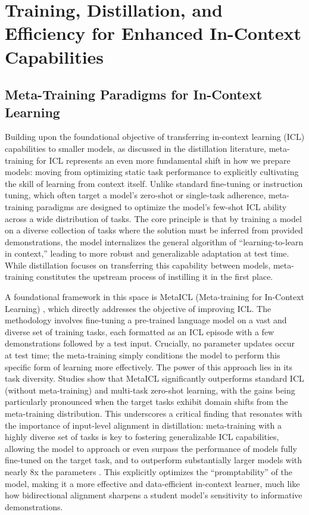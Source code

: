 \documentclass[11pt]{article}
\begin{document}
\section{Training, Distillation, and Efficiency for Enhanced In-Context Capabilities}

\subsection{Meta-Training Paradigms for In-Context Learning}

Building upon the foundational objective of transferring in-context learning (ICL) capabilities to smaller models, as discussed in the distillation literature, meta-training for ICL represents an even more fundamental shift in how we prepare models: moving from optimizing static task performance to explicitly cultivating the skill of learning from context itself. Unlike standard fine-tuning or instruction tuning, which often target a model's zero-shot or single-task adherence, meta-training paradigms are designed to optimize the model's few-shot ICL ability across a wide distribution of tasks. The core principle is that by training a model on a diverse collection of tasks where the solution must be inferred from provided demonstrations, the model internalizes the general algorithm of ``learning-to-learn in context,'' leading to more robust and generalizable adaptation at test time. While distillation focuses on transferring this capability between models, meta-training constitutes the upstream process of instilling it in the first place.

A foundational framework in this space is MetaICL (Meta-training for In-Context Learning) \cite{ref188}, which directly addresses the objective of improving ICL. The methodology involves fine-tuning a pre-trained language model on a vast and diverse set of training tasks, each formatted as an ICL episode with a few demonstrations followed by a test input. Crucially, no parameter updates occur at test time; the meta-training simply conditions the model to perform this specific form of learning more effectively. The power of this approach lies in its task diversity. Studies show that MetaICL significantly outperforms standard ICL (without meta-training) and multi-task zero-shot learning, with the gains being particularly pronounced when the target tasks exhibit domain shifts from the meta-training distribution. This underscores a critical finding that resonates with the importance of input-level alignment in distillation: meta-training with a highly diverse set of tasks is key to fostering generalizable ICL capabilities, allowing the model to approach or even surpass the performance of models fully fine-tuned on the target task, and to outperform substantially larger models with nearly 8x the parameters \cite{ref188}. This explicitly optimizes the ``promptability'' of the model, making it a more effective and data-efficient in-context learner, much like how bidirectional alignment sharpens a student model's sensitivity to informative demonstrations.
\end{document}
